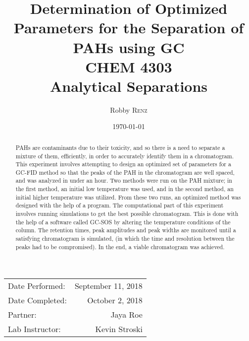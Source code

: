 \documentclass[a4paper, 12pt]{article}
\title{Determination of Optimized Parameters for the Separation of PAHs using GC \\ CHEM 4303 \\ Analytical Separations} %
\author{Robby \textsc{Renz}} %
\date{\today} %
\begin{document}
\maketitle %

\begin{center}
\begin{tabular}{l r}
Date Performed: & September 11, 2018 \\ %
Date Completed: & October 2, 2018 \\
Partner: & Jaya Roe \\ %
Lab Instructor: & Kevin Stroski %
\end{tabular}
\end{center}


\begin{abstract}
PAHs are contaminants due to their toxicity, and so there is a need to separate a mixture of them, efficiently, in order to accurately identify them in a chromatogram. This experiment involves attempting to design an optimized set of parameters for a GC-FID method so that the peaks of the PAH in the chromatogram are well spaced, and was analyzed in under an hour. Two methods were run on the PAH mixture; in the first method, an initial low temperature was used, and in the second method, an initial higher temperature was utilized. From these two runs, an optimized method was designed with the help of a program. The computational part of this experiment involves running simulations to get the best possible chromatogram. This is done with the help of a software called GC-SOS\textsuperscript{\textregistered} by altering  the temperature conditions of the column. The retention times, peak amplitudes and peak widths are monitored until a satisfying chromatogram is simulated, (in which the time and resolution between the peaks had to be compromised). In the end, a viable chromatogram was achieved.

\end{abstract}

\newpage

\end{document}
